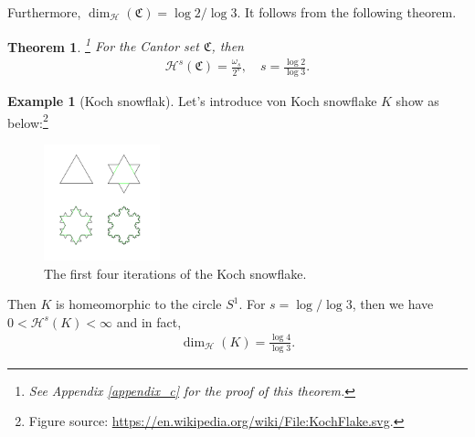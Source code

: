 \documentclass[11pt]{book}
\newtheorem{theorem}{Theorem}[chapter]
\theoremstyle{definition}
\newtheorem{example}{Example}[chapter]
\numberwithin{equation}{chapter}
\def\CC{\mathfrak{C}}
\def\H{{\mathcal H}}
\begin{document}
\medskip

Furthermore, $\dim_{\H}(\CC) = \log 2/\log 3$. It follows from the following theorem.

\medskip

\begin{theorem}\footnote{See Appendix \ref{appendix_c} for the proof of this theorem.}
For the Cantor set $\CC$, then
\begin{align*}
    \H^s(\CC) = \frac{\omega_s}{2^s}, \quad s = \frac{\log 2}{\log 3}.
\end{align*}
\end{theorem}

\medskip

\begin{example}[Koch snowflak]
Let's introduce von Koch snowflake $K$ show as below:\footnote{Figure source: \url{https://en.wikipedia.org/wiki/File:KochFlake.svg}.}
\begin{figure}[H]
    \centering
    \includegraphics[width=0.3\textwidth]{KochFlake}
    \caption{The first four iterations of the Koch snowflake.}
    \label{fig:koch_snowflake}
\end{figure}

Then $K$ is homeomorphic to the circle $S^1$. For $s = \log/\log 3$, then we have $0 < \H^s(K) < \infty$ and in fact,
\begin{align*}
    \dim_{\H}(K) = \frac{\log 4}{\log 3}.
\end{align*}
\end{example}

\medskip
\end{document}
